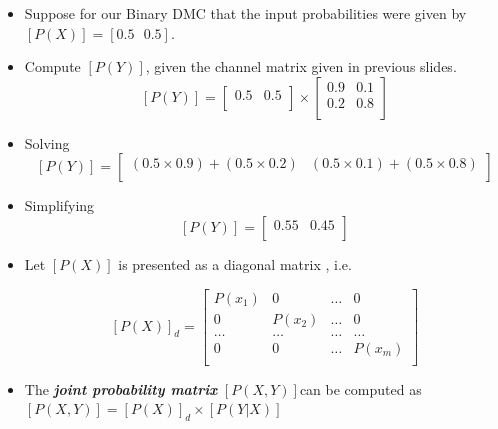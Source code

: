 \documentclass[a4paper,12pt]{article}
\begin{document}
\begin{itemize}
\item Suppose for our Binary DMC that the input probabilities were given by $[P(X)] = [ 0.5\mbox{   }0.5]$.
\item Compute $[P(Y)]$, given the channel matrix given in previous slides.
\[  [P(Y)]  =  \left[ \begin{array}{cc}
0.5 & 0.5 \\
\end{array} \right] \times \left[ \begin{array}{cc}
0.9 & 0.1  \\
0.2 & 0.8 \\
\end{array} \right] \]

\item Solving
\[  [P(Y)]  =  \left[ \begin{array}{cc}
(0.5 \times 0.9)+(0.5 \times 0.2) & (0.5 \times 0.1)+(0.5 \times 0.8) \\
\end{array} \right]  \]

\item Simplifying \[  [P(Y)]  =  \left[ \begin{array}{cc}
0.55 & 0.45 \\
\end{array} \right]  \]
\end{itemize}





\begin{itemize}
\item Let $[P(X)]$ is presented as a diagonal matrix , i.e.

\[  [P(X)]_d  = \left[ \begin{array}{cccc}
P(x_1) &0 & \ldots & 0 \\
0 & P(x_2)& \ldots & 0 \\
\ldots & \ldots & \ldots & \ldots \\
0& 0 & \ldots & P(x_m) \\
\end{array} \right] \]
\item The \emph{\textbf{ joint probability matrix}} $[P(X,Y)]$can be computed as
$[P(X,Y)]  = [P(X)]_d\times [P(Y|X)]$
\end{itemize}
\end{document}
